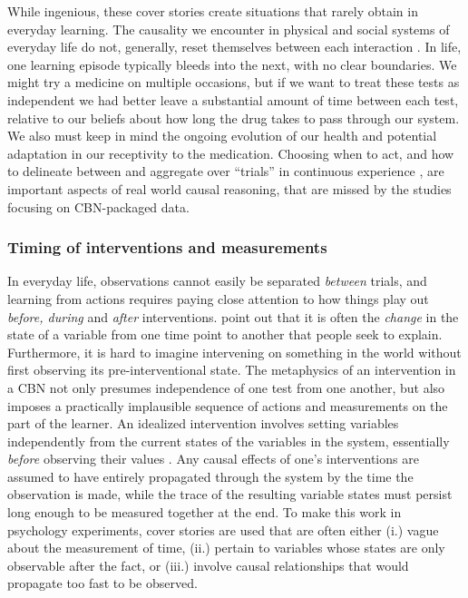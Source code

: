 \documentclass{cambridge7A}%
\begin{document}
While ingenious, these cover stories create situations that rarely obtain in everyday learning.  The causality we encounter in physical and social systems of everyday life do not, generally, reset themselves between each interaction \citep{greville2007influence,rottman2016searching}.  In life, one learning episode typically bleeds into the next, with no clear boundaries.  We might try a medicine on multiple occasions, but if we want to treat these tests as independent we had better leave a substantial amount of time between each test, relative to our beliefs about how long the drug takes to pass through our system.  We also must keep in mind the ongoing evolution of our health and potential adaptation in our receptivity to the medication. Choosing when to act, and how to delineate between and aggregate over ``trials'' in continuous experience \citep[cf][]{tulving1972episodic,gallistel2000time}, are important aspects of real world causal reasoning, that are missed by the studies focusing on CBN-packaged data.


\subsubsection{Timing of interventions and measurements}

In everyday life, observations cannot easily be separated \emph{between} trials, and learning from actions requires paying close attention to how things play out \emph{before, during} and \emph{after} interventions.   \cite{rottman2012causal} point out that it is often the \emph{change} in the state of a variable from one time point to another that people seek to explain.  Furthermore, it is hard to imagine intervening on something in the world without first observing its pre-interventional state.  The metaphysics of an intervention in a CBN not only presumes independence of one test from one another, but also imposes a practically implausible sequence of actions and measurements on the part of the learner.  An idealized intervention involves setting variables independently from the current states of the variables in the system, essentially \emph{before} observing their values \citep{pearl2000causality}.  Any causal effects of one's interventions are assumed to have entirely propagated through the system by the time the observation is made, while the trace of the resulting variable states must persist long enough to be measured together at the end.  
To make this work in psychology experiments, cover stories are used that are often either (i.) vague about the measurement of time, (ii.) pertain to variables whose states are only observable after the fact, or (iii.) involve causal relationships that would propagate too fast to be observed.  
\end{document}
